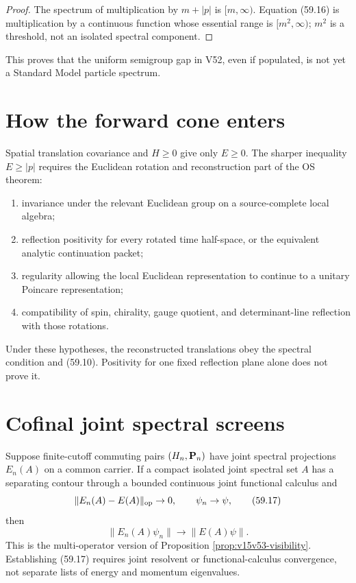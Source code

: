 \documentclass[11pt]{article}
\theoremstyle{remark}
\begin{document}
\begin{proof}
The spectrum of multiplication by \(m+|p|\) is
\([m,\infty)\).  Equation (59.16) is multiplication by a continuous
function whose essential range is \([m^2,\infty)\); \(m^2\) is a
threshold, not an isolated spectral component.
\end{proof}

This proves that the uniform semigroup gap in V52, even if
populated, is not yet a Standard Model particle spectrum.

\section{How the forward cone enters}

Spatial translation covariance and \(H\geq0\) give only
\(E\geq0\).  The sharper inequality \(E\geq|p|\) requires the
Euclidean rotation and reconstruction part of the OS theorem:
\begin{enumerate}
\item invariance under the relevant Euclidean group on a
      source-complete local algebra;
\item reflection positivity for every rotated time half-space, or
      the equivalent analytic continuation packet;
\item regularity allowing the local Euclidean representation to
      continue to a unitary Poincare representation;
\item compatibility of spin, chirality, gauge quotient, and
      determinant-line reflection with those rotations.
\end{enumerate}
Under these hypotheses, the reconstructed translations obey the
spectral condition and (59.10).  Positivity for one fixed reflection
plane alone does not prove it.

\section{Cofinal joint spectral screens}

Suppose finite-cutoff commuting pairs
\((H_n,{\bf P}_n)\) have joint spectral projections \(E_n(A)\) on a
common carrier.  If a compact isolated joint spectral set \(A\) has
a separating contour through a bounded continuous joint functional
calculus and
\[
 \|E_n(A)-E(A)\|_{\rm op}\to0,\qquad
 \psi_n\to\psi,                                         \tag{59.17}
\]
then
\[
 \|E_n(A)\psi_n\|\to\|E(A)\psi\|.                       \tag{59.18}
\]
This is the multi-operator version of Proposition
\ref{prop:v15v53-visibility}.  Establishing (59.17) requires joint
resolvent or functional-calculus convergence, not separate lists of
energy and momentum eigenvalues.
\end{document}

